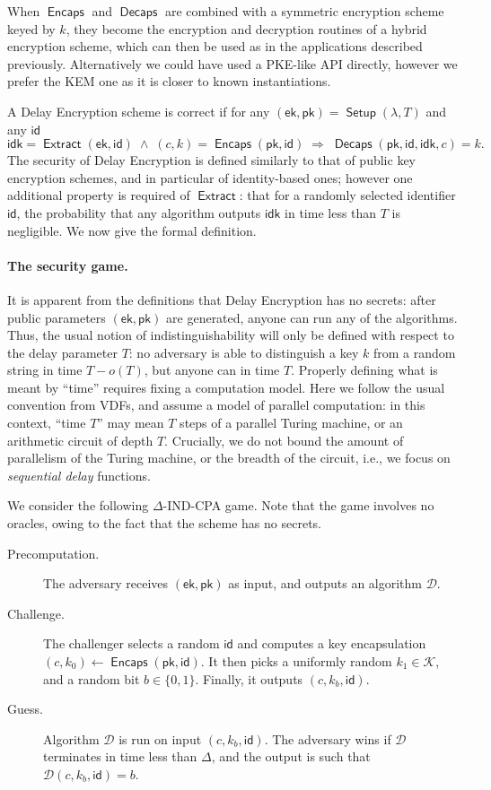 \documentclass{llncs}
\DeclareMathOperator{\Setup}{\mathsf{Setup}}
\DeclareMathOperator{\Extract}{\mathsf{Extract}}
\DeclareMathOperator{\Encaps}{\mathsf{Encaps}}
\DeclareMathOperator{\Decaps}{\mathsf{Decaps}}
\newcommand{\ek}{\mathsf{ek}}
\newcommand{\pk}{\mathsf{pk}}
\newcommand{\id}{\mathsf{id}}
\newcommand{\idk}{\mathsf{idk}}
\newcommand{\keyspace}{\mathcal{K}}
\begin{document}
When $\Encaps$ and $\Decaps$ are combined with a symmetric encryption
scheme keyed by $k$, they become the encryption and decryption
routines of a hybrid encryption scheme, which can then be used as in
the applications described previously. %
Alternatively we could have used a PKE-like API directly, however we
prefer the KEM one as it is closer to known instantiations.

A Delay Encryption scheme is correct if for any
$(\ek,\pk)=\Setup(\lambda,T)$ and any $\id$
\[\idk=\Extract(\ek,\id)
  \;\wedge\;
  (c,k) = \Encaps(\pk,\id)
  \;\Rightarrow\;
  \Decaps(\pk,\id,\idk,c) = k.\]
The security of Delay Encryption is defined similarly to that of
public key encryption schemes, and in particular of identity-based
ones; however one additional property is required of $\Extract$: that
for a randomly selected identifier $\id$, the probability that any
algorithm outputs $\idk$ in time less than $T$ is negligible. %
We now give the formal definition.

\paragraph{The security game.} It is apparent from the definitions
that Delay Encryption has no secrets: after public parameters $(\ek,\pk)$
are generated, anyone can run any of the algorithms. %
Thus, the usual notion of indistinguishability will only be defined
with respect to the delay parameter $T$: no adversary is able to
distinguish a key $k$ from a random string in time $T-o(T)$, but
anyone can in time $T$. %
Properly defining what is meant by ``time'' requires fixing a
computation model. %
Here we follow the usual convention from VDFs, and assume a model of
parallel computation: in this context, ``time $T$'' may mean $T$ steps
of a parallel Turing machine, or an arithmetic circuit of depth $T$. %
Crucially, we do not bound the amount of parallelism of the Turing
machine, or the breadth of the circuit, i.e., we focus on
\emph{sequential delay} functions.

We consider the following $\Delta$-IND-CPA game. %
Note that the game involves no oracles, owing to the fact that the
scheme has no secrets. %
%
\begin{description}
\item[Precomputation.] The adversary receives $(\ek,\pk)$ as input, and
  outputs an algorithm $\mathcal{D}$. %
\item[Challenge.] The challenger selects a random $\id$ and computes
  a key encapsulation $(c,k_0)\gets\Encaps(\pk,\id)$. %
  It then picks a uniformly random $k_1\in\keyspace$, and a random bit
  $b\in\{0,1\}$. %
  Finally, it outputs $(c,k_b,\id)$.
\item[Guess.]  Algorithm $\mathcal{D}$ is run on input
  $(c,k_b,\id)$. %
  The adversary wins if $\mathcal{D}$ terminates in time less than
  $\Delta$, and the output is such that $\mathcal{D}(c,k_b,\id) = b$.
\end{description}
\end{document}
